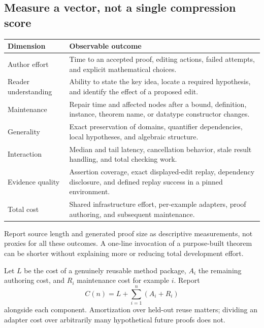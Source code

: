 \documentclass[11pt,letterpaper]{article}
\begin{document}
\subsection{Measure a vector, not a single compression score}
\begin{tabularx}{\textwidth}{@{}P{.23\textwidth}Y@{}}
\toprule
Dimension & Observable outcome \\
\midrule
Author effort & Time to an accepted proof, editing actions, failed attempts,
  and explicit mathematical choices.\\
Reader understanding & Ability to state the key idea, locate a required hypothesis,
  and identify the effect of a proposed edit.\\
Maintenance & Repair time and affected nodes after a bound, definition, instance,
  theorem name, or datatype constructor changes.\\
Generality & Exact preservation of domains, quantifier dependencies, local
  hypotheses, and algebraic structure.\\
Interaction & Median and tail latency, cancellation behavior, stale result
  handling, and total checking work.\\
Evidence quality & Assertion coverage, exact displayed-edit replay, dependency
  disclosure, and defined replay success in a pinned environment.\\
Total cost & Shared infrastructure effort, per-example adapters, proof authoring,
  and subsequent maintenance.\\
\bottomrule
\end{tabularx}

Report source length and generated proof size as descriptive measurements, not
proxies for all these outcomes. A one-line invocation of a purpose-built theorem
can be shorter without explaining more or reducing total development effort.

Let \(L\) be the cost of a genuinely reusable method package, \(A_i\) the remaining
authoring cost, and \(R_i\) maintenance cost for example \(i\). Report
\[
 C(n)=L+\sum_{i=1}^{n}(A_i+R_i)
\]
alongside each component. Amortization over held-out reuse matters; dividing an
adapter cost over arbitrarily many hypothetical future proofs does not.
\end{document}
